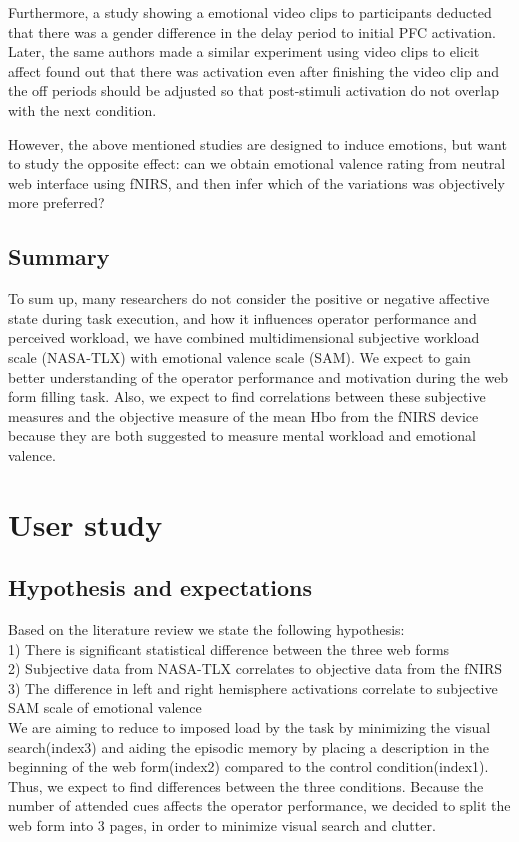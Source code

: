 \documentclass[a4paper]{report}
\begin{document}
			Furthermore, a study showing a emotional video clips\cite{leon2006differential} to participants deducted that there was a gender difference in the delay period to initial PFC activation. Later, the same authors made a similar experiment \cite{leon2007lasting} using video clips to elicit affect found out that there was activation even after finishing the video clip and the off periods should be adjusted so that post-stimuli activation do not overlap with the next condition.

			However, the above mentioned studies are designed to induce emotions, but want to study the opposite effect: can we obtain emotional valence rating from neutral web interface using fNIRS, and then infer which of the variations was objectively more preferred?

	\section{Summary}
		To sum up, many researchers do not consider the positive or negative affective state during task execution, and how it influences operator performance and perceived workload, we have combined multidimensional subjective workload scale (NASA-TLX) with emotional valence scale (SAM). We expect to gain better understanding of the operator performance and motivation during the web form filling task. Also, we expect to find correlations between these subjective measures and the objective measure of the mean Hbo from the fNIRS device because they are both suggested to measure mental workload and emotional valence. 

		
\chapter{User study}
	\section{Hypothesis and expectations}
	Based on the literature review we state the following hypothesis:\\
	1) There is significant statistical difference between the three web forms\\
	2) Subjective data from NASA-TLX correlates to objective data from the fNIRS\\
	3) The difference in left and right hemisphere activations correlate to subjective SAM scale of emotional valence\\
	
	We are aiming to reduce to imposed load by the task by minimizing the visual search(index3) and aiding the episodic memory by placing a description in the beginning of the web form(index2) compared to the control condition(index1). Thus, we expect to find differences between the three conditions. Because the number of attended cues affects the operator performance, we decided to split the web form into 3 pages, in order to minimize visual search and clutter. 
	
\end{document}
